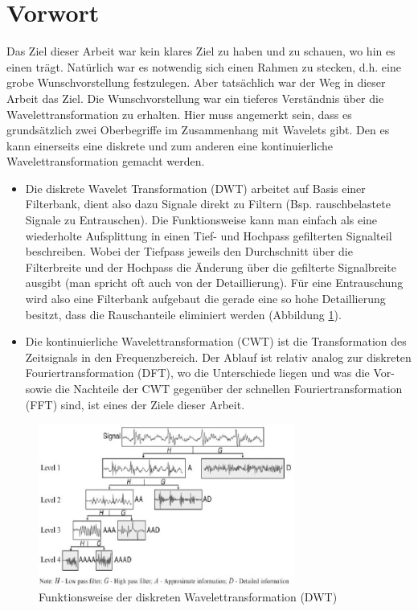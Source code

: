 %
%
%
%
\section{Vorwort\label{wavelets:section:teil0}}
Das Ziel dieser Arbeit war kein klares Ziel zu haben und zu schauen, wo hin es einen trägt. Natürlich war es notwendig sich einen Rahmen zu stecken, d.h. eine grobe Wunschvorstellung festzulegen. Aber tatsächlich war der Weg in dieser Arbeit das Ziel.
Die Wunschvorstellung war ein tieferes Verständnis über die Wavelettransformation zu erhalten. Hier muss angemerkt sein, dass es grundsätzlich zwei Oberbegriffe im Zusammenhang mit Wavelets gibt.
Den es kann einerseits eine diskrete und zum anderen eine kontinuierliche Wavelettransformation gemacht werden.

\begin{itemize}
	\item   Die diskrete Wavelet Transformation (DWT) arbeitet auf Basis einer Filterbank, dient also dazu Signale direkt zu Filtern (Bsp. rauschbelastete Signale zu Entrauschen).
	Die Funktionsweise kann man einfach als eine wiederholte Aufsplittung in einen Tief- und Hochpass gefilterten Signalteil beschreiben. Wobei der Tiefpass jeweils den Durchschnitt über die Filterbreite und der Hochpass die Änderung über die gefilterte Signalbreite ausgibt (man spricht oft auch von der Detaillierung). Für eine Entrauschung wird also eine Filterbank aufgebaut die gerade eine so hohe Detaillierung besitzt, dass die Rauschanteile eliminiert werden (Abbildung \ref{wavelet:fig:1_Four-Level-Wavelet-Decomposition}).

 	\item Die kontinuierliche Wavelettransformation (CWT) ist die Transformation des Zeitsignals in den Frequenzbereich. Der Ablauf ist relativ analog zur diskreten Fouriertransformation (DFT), wo die Unterschiede liegen und was die Vor- sowie die Nachteile der CWT gegenüber der schnellen Fouriertransformation (FFT) sind, ist eines der Ziele dieser Arbeit. 
\end{itemize}

\begin{figure}
	\centering
	\includegraphics[width=0.75\textwidth]{papers/wavelets/images/1_Four-Level-Wavelet-Decomposition.png}
	\caption{Funktionsweise der diskreten Wavelettransformation (DWT) }
	\label{wavelet:fig:1_Four-Level-Wavelet-Decomposition}
\end{figure}

